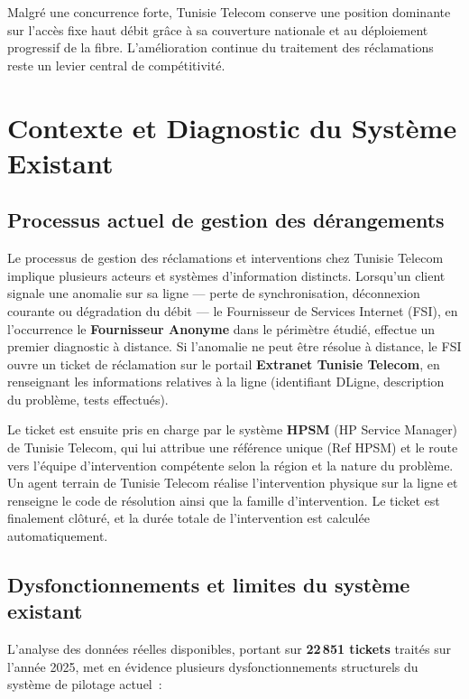 \documentclass[10pt,a4paper]{report}
\begin{document}
Malgré une concurrence forte, Tunisie Telecom conserve une position dominante sur l'accès fixe haut débit grâce à sa couverture nationale et au déploiement progressif de la fibre. L'amélioration continue du traitement des réclamations reste un levier central de compétitivité.

\section{Contexte et Diagnostic du Système Existant}

\subsection{Processus actuel de gestion des dérangements}

Le processus de gestion des réclamations et interventions chez Tunisie Telecom implique plusieurs acteurs et systèmes d'information distincts. Lorsqu'un client signale une anomalie sur sa ligne --- perte de synchronisation, déconnexion courante ou dégradation du débit --- le Fournisseur de Services Internet (FSI), en l'occurrence le \textbf{Fournisseur Anonyme} dans le périmètre étudié, effectue un premier diagnostic à distance. Si l'anomalie ne peut être résolue à distance, le FSI ouvre un ticket de réclamation sur le portail \textbf{Extranet Tunisie Telecom}, en renseignant les informations relatives à la ligne (identifiant DLigne, description du problème, tests effectués).

Le ticket est ensuite pris en charge par le système \textbf{HPSM} (HP Service Manager) de Tunisie Telecom, qui lui attribue une référence unique (Ref HPSM) et le route vers l'équipe d'intervention compétente selon la région et la nature du problème. Un agent terrain de Tunisie Telecom réalise l'intervention physique sur la ligne et renseigne le code de résolution ainsi que la famille d'intervention. Le ticket est finalement clôturé, et la durée totale de l'intervention est calculée automatiquement.

\subsection{Dysfonctionnements et limites du système existant}

L'analyse des données réelles disponibles, portant sur \textbf{22\,851 tickets} traités sur l'année 2025, met en évidence plusieurs dysfonctionnements structurels du système de pilotage actuel~:
\end{document}
